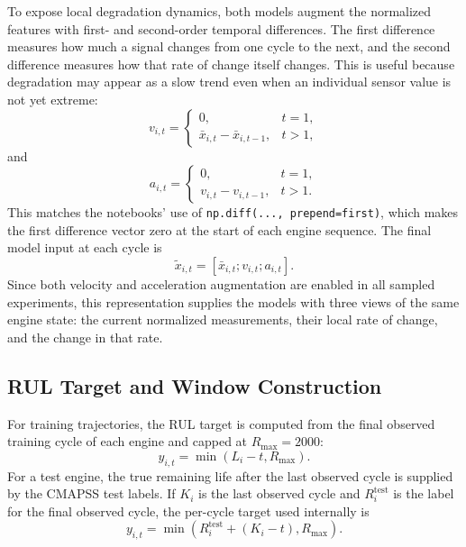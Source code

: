 \documentclass[11pt,a4paper]{article}
\begin{document}
To expose local degradation dynamics, both models augment the normalized features with first- and second-order temporal differences. The first difference measures how much a signal changes from one cycle to the next, and the second difference measures how that rate of change itself changes. This is useful because degradation may appear as a slow trend even when an individual sensor value is not yet extreme:
\begin{equation}
    v_{i,t} =
    \begin{cases}
        0, & t=1,\\
        \bar{x}_{i,t} - \bar{x}_{i,t-1}, & t>1,
    \end{cases}
\end{equation}
and
\begin{equation}
    a_{i,t} =
    \begin{cases}
        0, & t=1,\\
        v_{i,t} - v_{i,t-1}, & t>1.
    \end{cases}
\end{equation}
This matches the notebooks' use of \texttt{np.diff(..., prepend=first)}, which makes the first difference vector zero at the start of each engine sequence. The final model input at each cycle is
\begin{equation}
    \tilde{x}_{i,t} =
    [\bar{x}_{i,t}; v_{i,t}; a_{i,t}].
\end{equation}
Since both velocity and acceleration augmentation are enabled in all sampled experiments, this representation supplies the models with three views of the same engine state: the current normalized measurements, their local rate of change, and the change in that rate.

\subsection{RUL Target and Window Construction}

For training trajectories, the RUL target is computed from the final observed training cycle of each engine and capped at $R_{\max}=2000$:
\begin{equation}
    y_{i,t} = \min(L_i - t, R_{\max}).
\end{equation}
For a test engine, the true remaining life after the last observed cycle is supplied by the CMAPSS test labels. If $K_i$ is the last observed cycle and $R_i^{\mathrm{test}}$ is the label for the final observed cycle, the per-cycle target used internally is
\begin{equation}
    y_{i,t}
    =
    \min\left(R_i^{\mathrm{test}} + (K_i - t), R_{\max}\right).
\end{equation}
\end{document}
